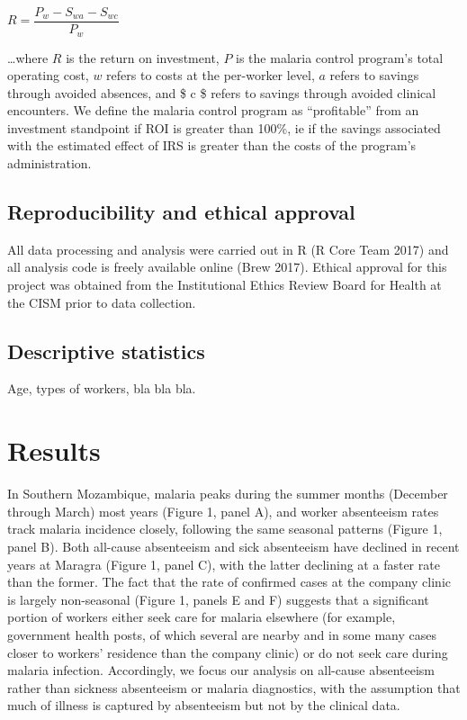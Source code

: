 \documentclass[]{article}
\begin{document}
\begin{center}
$R = \dfrac{P_{w} - S_{wa} - S_{wc}}{P_{w}}$

\end{center}

\ldots{}where \(R\) is the return on investment, \(P\) is the malaria
control program's total operating cost, \(w\) refers to costs at the
per-worker level, \(a\) refers to savings through avoided absences, and
\$ c \$ refers to savings through avoided clinical encounters. We define
the malaria control program as ``profitable'' from an investment
standpoint if ROI is greater than 100\%, ie if the savings associated
with the estimated effect of IRS is greater than the costs of the
program's administration.

\subsection{Reproducibility and ethical
approval}\label{reproducibility-and-ethical-approval}

All data processing and analysis were carried out in R (R Core Team
2017) and all analysis code is freely available online (Brew 2017).
Ethical approval for this project was obtained from the Institutional
Ethics Review Board for Health at the CISM prior to data collection.

\subsection{Descriptive statistics}\label{descriptive-statistics}

Age, types of workers, bla bla bla.

\section{Results}\label{results}

In Southern Mozambique, malaria peaks during the summer months (December
through March) most years (Figure 1, panel A), and worker absenteeism
rates track malaria incidence closely, following the same seasonal
patterns (Figure 1, panel B). Both all-cause absenteeism and sick
absenteeism have declined in recent years at Maragra (Figure 1, panel
C), with the latter declining at a faster rate than the former. The fact
that the rate of confirmed cases at the company clinic is largely
non-seasonal (Figure 1, panels E and F) suggests that a significant
portion of workers either seek care for malaria elsewhere (for example,
government health posts, of which several are nearby and in some many
cases closer to workers' residence than the company clinic) or do not
seek care during malaria infection. Accordingly, we focus our analysis
on all-cause absenteeism rather than sickness absenteeism or malaria
diagnostics, with the assumption that much of illness is captured by
absenteeism but not by the clinical data.
\end{document}
